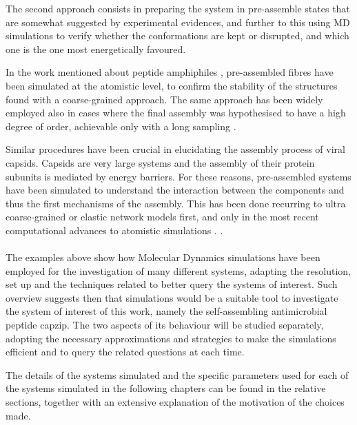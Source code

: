 The second approach consists in preparing the system in pre-assemble states that are somewhat suggested by experimental evidences, and further to this using MD simulations to verify whether the conformations are kept or disrupted, and which one is the one most energetically favoured. 

In the work mentioned about peptide amphiphiles \citep{Lee2012}, pre-assembled fibres have been simulated at the atomistic level, to confirm the stability of the structures found with a coarse-grained approach.
%
The same approach has been widely employed also in cases where the final assembly was hypothesised to have a high degree of order, achievable only with a long sampling \citep{Gudlur2012}.

Similar procedures have been crucial in elucidating the assembly process of viral capsids. Capsids are very large systems and the assembly of their protein subunits is mediated by energy barriers. For these reasons, pre-assembled systems have been simulated to understand the interaction between the components and thus the first mechanisms of the assembly. This has been done recurring to ultra coarse-grained or elastic network models \citep{Grime2016,AbiMansour2014} first, and only in the most recent computational advances to atomistic simulations \citep{Perilla2016,Hadden2018}. \citep{AbiMansour2014}.


\paragraph{}
The examples above show how Molecular Dynamics simulations have been employed for the investigation of many different systems, adapting the resolution, set up and the techniques related to better query the systems of interest. Such overview suggests then that simulations would be a suitable tool to investigate the system of interest of this work, namely the self-assembling antimicrobial peptide capzip. The two aspects of its behaviour will be studied separately, adopting the necessary approximations and strategies to make the simulations efficient and to query the related questions at each time.

The details of the systems simulated and the specific parameters used for each of the systems simulated in the following chapters can be found in the relative sections, together with an extensive explanation of the motivation of the choices made.
